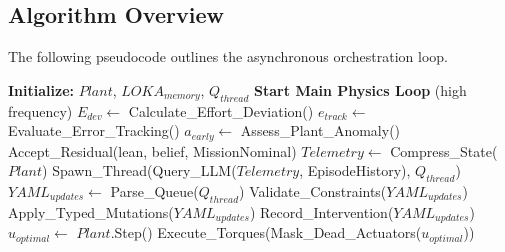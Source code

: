 \subsection{Algorithm Overview}
\label{sec:algorithm}

The following pseudocode outlines the asynchronous orchestration loop.

\begin{algorithmic}[1]
\STATE \textbf{Initialize:} $Plant$, $LOKA_{memory}$, $Q_{thread}$
\STATE \textbf{Start Main Physics Loop} (high frequency)
    \STATE $E_{dev} \leftarrow$ Calculate\_Effort\_Deviation()
    \STATE $e_{track} \leftarrow$ Evaluate\_Error\_Tracking()
    \STATE $a_{early} \leftarrow$ Assess\_Plant\_Anomaly()
            \STATE Accept\_Residual(lean, belief, MissionNominal)
        \ELSE
            \STATE $Telemetry \leftarrow$ Compress\_State($Plant$)
            \STATE Spawn\_Thread(Query\_LLM($Telemetry$, EpisodeHistory), $Q_{thread}$)
        \ENDIF
    \ENDIF
        \STATE $YAML_{updates} \leftarrow$ Parse\_Queue($Q_{thread}$)
        \STATE Validate\_Constraints($YAML_{updates}$)
        \STATE Apply\_Typed\_Mutations($YAML_{updates}$)
        \STATE Record\_Intervention($YAML_{updates}$)
    \ENDIF
    \STATE $u_{optimal} \leftarrow$ $Plant$.Step()
    \STATE Execute\_Torques(Mask\_Dead\_Actuators($u_{optimal}$))
\ENDWHILE
\end{algorithmic}
